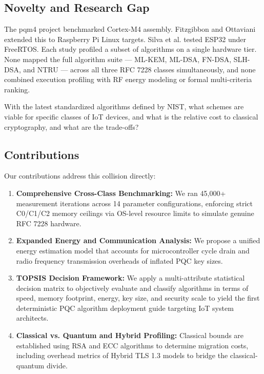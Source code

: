 \subsection{Novelty and Research Gap}

The pqm4 project \cite{kannwischer2019pqm4} benchmarked Cortex-M4 assembly. Fitzgibbon and Ottaviani \cite{fitzgibbon2024benchmarking} extended this to Raspberry Pi Linux targets. Silva et al. \cite{secrypt2025esp32} tested ESP32 under FreeRTOS. Each study profiled a subset of algorithms on a single hardware tier. None mapped the full algorithm suite — ML-KEM, ML-DSA, FN-DSA, SLH-DSA, and NTRU — across all three RFC 7228 classes simultaneously, and none combined execution profiling with RF energy modeling or formal multi-criteria ranking.

With the latest standardized algorithms defined by NIST, what schemes are viable for specific classes of IoT devices, and what is the relative cost to classical cryptography, and what are the trade-offs?

\subsection{Contributions}

Our contributions address this collision directly:
\begin{enumerate}
 \item \textbf{Comprehensive Cross-Class Benchmarking:} We ran 45,000+ measurement iterations across 14 parameter configurations, enforcing strict C0/C1/C2 memory ceilings via OS-level resource limits to simulate genuine RFC 7228 hardware.
 \item \textbf{Expanded Energy and Communication Analysis:} We propose a unified energy estimation model that accounts for microcontroller cycle drain and radio frequency transmission overheads of inflated PQC key sizes.
 \item \textbf{TOPSIS Decision Framework:} We apply a multi-attribute statistical decision matrix to objectively evaluate and classify algorithms in terms of speed, memory footprint, energy, key size, and security scale to yield the first deterministic PQC algorithm deployment guide targeting IoT system architects.
 \item \textbf{Classical vs. Quantum and Hybrid Profiling:} Classical bounds are established using RSA and ECC algorithms to determine migration costs, including overhead metrics of Hybrid TLS 1.3 models to bridge the classical-quantum divide.
\end{enumerate}
